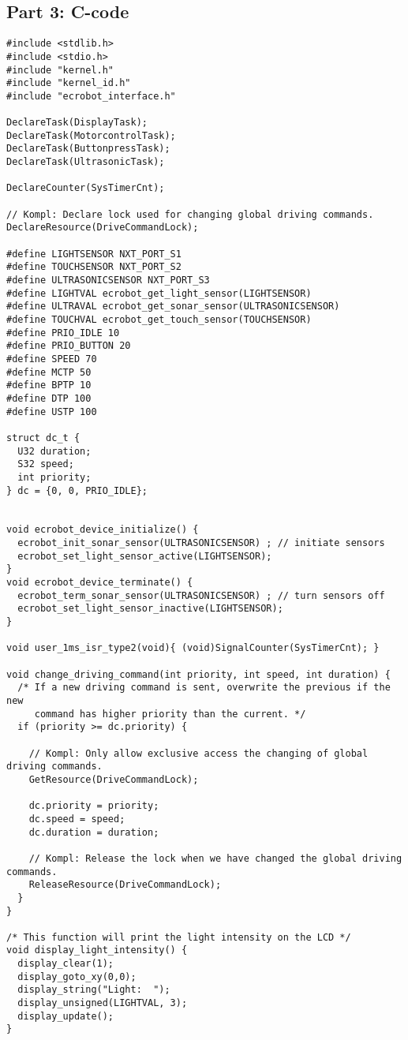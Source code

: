 \documentclass[a4paper,10pt]{report}
\begin{document}
\subsection*{Part 3: C-code}
\begin{lstlisting}[label=some-code,caption=part3.c,mathescape]
#include <stdlib.h>
#include <stdio.h>
#include "kernel.h"
#include "kernel_id.h"
#include "ecrobot_interface.h"

DeclareTask(DisplayTask);
DeclareTask(MotorcontrolTask);
DeclareTask(ButtonpressTask);
DeclareTask(UltrasonicTask);

DeclareCounter(SysTimerCnt);

// Kompl: Declare lock used for changing global driving commands.
DeclareResource(DriveCommandLock);

#define LIGHTSENSOR NXT_PORT_S1
#define TOUCHSENSOR NXT_PORT_S2
#define ULTRASONICSENSOR NXT_PORT_S3
#define LIGHTVAL ecrobot_get_light_sensor(LIGHTSENSOR)
#define ULTRAVAL ecrobot_get_sonar_sensor(ULTRASONICSENSOR)
#define TOUCHVAL ecrobot_get_touch_sensor(TOUCHSENSOR)
#define PRIO_IDLE 10
#define PRIO_BUTTON 20
#define SPEED 70
#define MCTP 50
#define BPTP 10
#define DTP 100
#define USTP 100

struct dc_t {
  U32 duration;
  S32 speed;
  int priority;
} dc = {0, 0, PRIO_IDLE};


void ecrobot_device_initialize() {
  ecrobot_init_sonar_sensor(ULTRASONICSENSOR) ; // initiate sensors
  ecrobot_set_light_sensor_active(LIGHTSENSOR);
}
void ecrobot_device_terminate() {
  ecrobot_term_sonar_sensor(ULTRASONICSENSOR) ; // turn sensors off
  ecrobot_set_light_sensor_inactive(LIGHTSENSOR);
}

void user_1ms_isr_type2(void){ (void)SignalCounter(SysTimerCnt); } 

void change_driving_command(int priority, int speed, int duration) {
  /* If a new driving command is sent, overwrite the previous if the new
     command has higher priority than the current. */
  if (priority >= dc.priority) {
	
	// Kompl: Only allow exclusive access the changing of global driving commands.
	GetResource(DriveCommandLock);
  
    dc.priority = priority;
    dc.speed = speed;
    dc.duration = duration;
	
	// Kompl: Release the lock when we have changed the global driving commands.
	ReleaseResource(DriveCommandLock);
  }
}

/* This function will print the light intensity on the LCD */
void display_light_intensity() {
  display_clear(1);
  display_goto_xy(0,0);
  display_string("Light:  ");
  display_unsigned(LIGHTVAL, 3);
  display_update();
}


\end{lstlisting}
\end{document}
